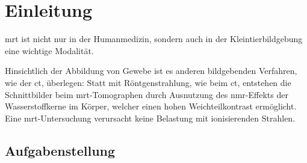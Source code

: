 \chapter{Einleitung}

\gls{mrt} ist nicht nur in der Humanmedizin, sondern auch in der Kleintierbildgebung eine wichtige Modalität.

 Hinsichtlich der Abbildung von Gewebe ist es anderen bildgebenden Verfahren, wie der \gls{ct}, überlegen: Statt mit Röntgenstrahlung, wie beim \gls{ct}, entstehen die Schnittbilder beim \gls{mrt}-Tomographen durch Ausnutzung des \gls{nmr}-Effekts der Wasserstoffkerne im Körper, welcher einen hohen Weichteilkontrast ermöglicht. Eine \gls{mrt}-Untersuchung verursacht keine Belastung mit ionisierenden Strahlen.
 
\section{Aufgabenstellung}


